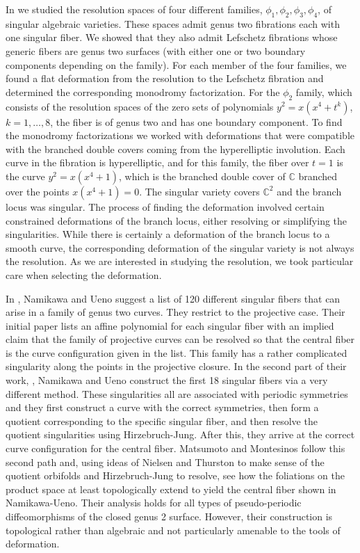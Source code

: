 \documentclass[11pt,letterpaper,reqno]{amsart}
\theoremstyle{remark}
\newcommand{\CC}{{\mathbb C}}
\begin{document}
In \cite{SV} we studied the resolution spaces of four different families, $\phi_1, \phi_2, \phi_3, \phi_4$, of singular algebraic varieties. These spaces admit genus two fibrations each with one singular fiber. We showed that they also admit Lefschetz fibrations whose generic fibers are genus two surfaces (with either one or two boundary components depending on the family). For each member of the four families, we found a flat deformation from the resolution to the Lefschetz fibration and determined the corresponding monodromy factorization. For the $\phi_2$ family, which consists of the resolution spaces of the zero sets of polynomials $y^2 = x(x^4 + t^k)$, $k = 1,\dots, 8$, the fiber is of genus two and has one boundary component. To find the monodromy factorizations we worked with deformations that were compatible with the branched double covers coming from the hyperelliptic involution. Each curve in the fibration is hyperelliptic, and for this family, the fiber over $t=1$ is the curve $y^2 = x(x^4+1)$, which is the branched double cover of $\CC$ branched over the points $x(x^4+1)=0$. The singular variety covers $\CC^2$ and the branch locus was singular. The process of finding the deformation involved certain constrained deformations of the branch locus, either resolving or simplifying the singularities. While there is certainly a deformation of the branch locus to a smooth curve, the corresponding deformation of the singular variety is not always the resolution. As we are interested in studying the resolution, we took particular care when selecting the deformation.

In \cite{NamikawaUeno-list}, Namikawa and Ueno suggest a list of 120 different singular fibers that can arise in a family of genus two curves. They restrict to the projective case. Their initial paper lists an affine polynomial for each singular fiber with an implied claim that the family of projective curves can be resolved so that the central fiber is the curve configuration given in the list. This family has a rather complicated singularity along the points in the projective closure. In the second part of their work, \cite{NamikawaUeno-long}, Namikawa and Ueno construct the first 18 singular fibers via a very different method. These singularities all are associated with periodic symmetries and they first construct a curve with the correct symmetries, then form a quotient corresponding to the specific singular fiber, and then resolve the quotient singularities using Hirzebruch-Jung. After this, they arrive at the correct curve configuration for the central fiber. Matsumoto and Montesinos \cite{MatsumotoMontesinos-book} follow this second path and, using ideas of Nielsen and Thurston to make sense of the quotient orbifolds and Hirzebruch-Jung to resolve, see how the foliations on the product space at least topologically extend to yield the central fiber shown in Namikawa-Ueno. Their analysis holds for all types of pseudo-periodic diffeomorphisms of the closed genus 2 surface. However, their construction is topological rather than algebraic and not particularly amenable to the tools of deformation. 
\end{document}
